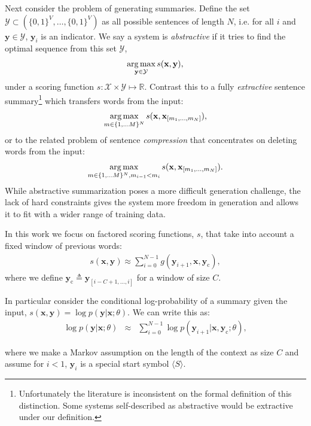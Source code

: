 \documentclass[11pt,a4paper]{article}
\newcommand{\xvec}{\mathbf{x}}
\newcommand{\yvec}{\mathbf{y}}
\newcommand{\mcY}{\mathcal{Y}}
\newcommand{\context}{\mathbf{y}_{\mathrm{c}}}
\newcommand{\reals}{\mathbb{R}}
\def\argmax{\operatornamewithlimits{arg\,max}}
\begin{document}
Next consider the problem of generating summaries. Define the set $\mcY
\subset (\{0,1\}^{V}, \ldots, \{0,1\}^{V})$ as all possible sentences of
length $N$, i.e. for all $i$ and $\yvec \in \mcY$, $\yvec_i$ is an
indicator.  We say a system is \textit{abstractive} if it tries to
find the optimal sequence from this set $\mcY$, 
\begin{eqnarray} \argmax_{\yvec \in \mcY} s(\xvec, \yvec), \end{eqnarray}
\noindent under a scoring function $s: \mathcal{X} \times
\mathcal{Y} \mapsto \reals$. Contrast this to a fully
\textit{extractive} sentence summary\footnote{Unfortunately the literature is inconsistent on the formal definition of this distinction. Some systems self-described as abstractive would be extractive under our definition. } which transfers words from the input:
\begin{eqnarray}\argmax_{m \in \{1,\ldots M\}^N } s(\xvec, \xvec_{[m_1, \ldots,m_N]}), \label{eq:ext}\end{eqnarray}  
\noindent or to the related problem of sentence \textit{compression} that concentrates on deleting words from the input: 
\begin{eqnarray}
\argmax_{m \in \{1,\ldots M\}^N, m_{i-1} < m_{i} } s(\xvec, \xvec_{[m_1, \ldots,m_N]}). \end{eqnarray}
While abstractive summarization poses a more difficult generation challenge, the lack of hard constraints gives the system more freedom in generation and allows it to fit with a wider range of training data.

In this work we focus on factored scoring functions, $s$, that take into account a fixed window of previous words:
\begin{eqnarray} s(\xvec, \yvec) \approx \sum_{i=0}^{N-1} g(\yvec_{i+1}, \xvec, \context), \label{eq:factor}
\end{eqnarray}
\noindent where we define $\context \triangleq \yvec_{[i-C+1, \ldots, i]}$ for a window of size $C$. 

In particular consider the conditional log-probability of a summary given the input, $s(\xvec, \yvec) = \log p(\yvec | \xvec; \theta)$. We can write this as:
\begin{eqnarray*} 
  \log p(\yvec | \xvec; \theta) &\approx&\sum_{i=0}^{N-1} \log p(\yvec_{i+1} | \xvec, \context; \theta), 
\end{eqnarray*}

\noindent where we make a Markov assumption on the length of the
context as size $C$ and assume for $i < 1$, $\yvec_i$  is a special start symbol $\langle S \rangle$. 
\end{document}
